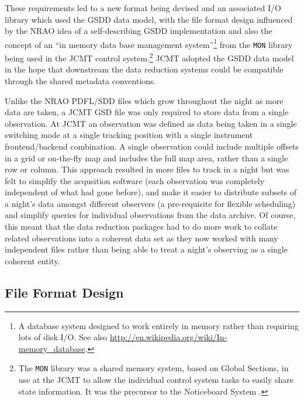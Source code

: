 \documentclass[final,authoryear,5p,times,twocolumn]{elsarticle}
\begin{document}
These requirements led to a new format being devised and an associated
I/O library which used the GSDD data model, with the file format
design influenced by the NRAO idea of a self-describing GSDD
implementation and also the concept of an ``in memory data base
management system''\footnote{A database system designed to work
  entirely in memory rather than requiring lots of disk I/O. See also
  \url{http://en.wikipedia.org/wiki/In-memory_database}.} from the
\texttt{MON} library being used in the JCMT control
system.\footnote{The \texttt{MON} library was a shared memory system,
  based on Global Sections, in use at the JCMT to allow the individual
  control system tasks to easily share state information. It was the
  precursor to the Noticeboard System \citep[NBS;][]{SUN77}.}  JCMT
adopted the GSDD data model in the hope that downstream the data
reduction systems could be compatible through the shared metadata
conventions.

Unlike the NRAO PDFL/SDD files which grow throughout the night as more
data are taken, a JCMT GSD file was only required to store data from a
single observation. At JCMT an observation was defined as data being
taken in a single switching mode at a single tracking position with a
single instrument frontend/backend combination. A single observation
could include multiple offsets in a grid or on-the-fly map and
includes the full map area, rather than a single row or column. This
approach resulted in more files to track in a night but was felt to
simplify the acqusition software (each observation was completely
independent of what had gone before), and make it easier to distribute
subsets of a night's data amongst different observers (a pre-requisite
for flexible scheduling) and simplify queries for individual
observations from the data archive. Of course, this meant that the
data reduction packages had to do more work to collate related
observations into a coherent data set as they now worked with many
independent files rather than being able to treat a night's observing
as a single coherent entity.

\subsection{File Format Design}
\end{document}
